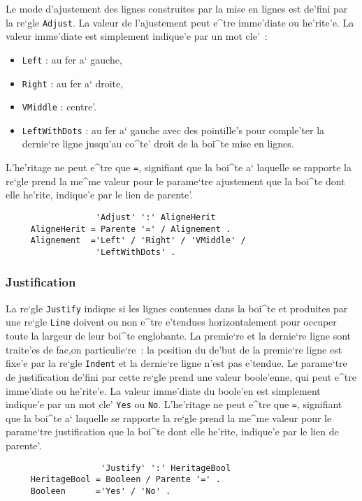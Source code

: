 {Le mode d'ajustement des lignes construites par la mise en lignes est
de'fini par la re`gle {\tt Adjust}. La valeur de l'ajustement peut e^tre
imme'diate ou he'rite'e. La valeur imme'diate est simplement indique'e par
un mot cle'~:
\begin{itemize}
   \item {\tt Left} : au fer a` gauche,
   \item {\tt Right} : au fer a` droite,
   \item {\tt VMiddle} : centre'.
   \item {\tt LeftWithDots} : au fer a` gauche avec des pointille's pour
         comple'ter la dernie`re ligne jusqu'au co^te' droit de la boi^te
         mise en lignes.
\end{itemize}
L'he'ritage ne peut e^tre que {\tt =}, signifiant que la boi^te a` laquelle
se rapporte la re`gle prend la me^me valeur pour le parame`tre ajustement
que la boi^te dont elle he'rite, indique'e par le lien de parente'.

\begin{verbatim}
                  'Adjust' ':' AligneHerit
     AligneHerit = Parente '=' / Alignement .
     Alignement  ='Left' / 'Right' / 'VMiddle' /
                  'LeftWithDots' .
\end{verbatim}

\subsubsection{Justification}

La re`gle {\tt Justify} indique si les lignes contenues dans la boi^te et
produites par une re`gle {\tt Line} doivent ou non e^tre e'tendues
horizontalement pour occuper toute la largeur de leur boi^te englobante.
La premie`re et la dernie`re ligne sont traite'es de fac,on particulie`re~:
la position du de'but de la premie`re ligne est fixe'e par la re`gle {\tt Indent}
et la dernie`re ligne n'est pas e'tendue. Le parame`tre de justification de'fini
par cette re`gle prend une valeur boole'enne, qui peut e^tre imme'diate ou
he'rite'e. La valeur imme'diate du boole'en est simplement indique'e par un
mot cle' {\tt Yes} ou {\tt No}. L'he'ritage ne peut e^tre que {\tt =},
signifiant que la boi^te a` laquelle se rapporte la re`gle prend la me^me
valeur pour le parame`tre justification que la boi^te dont elle he'rite,
indique'e par le lien de parente'.

\begin{verbatim}
                   'Justify' ':' HeritageBool
     HeritageBool = Booleen / Parente '=' .
     Booleen      ='Yes' / 'No' .
\end{verbatim}

}
